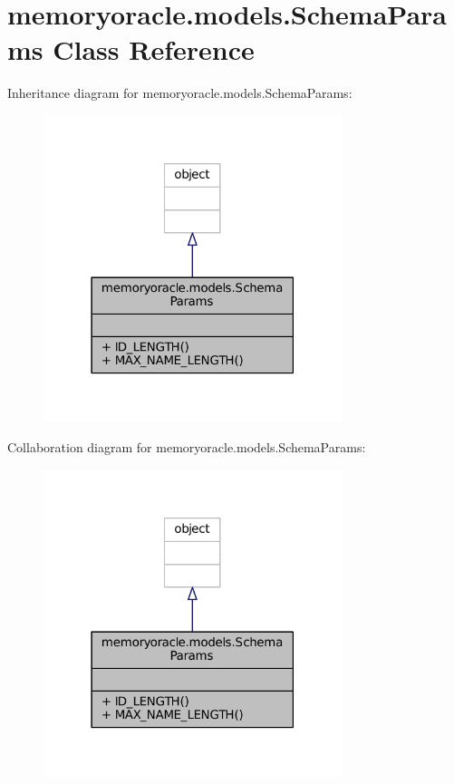 \hypertarget{classmemoryoracle_1_1models_1_1SchemaParams}{}\section{memoryoracle.\+models.\+Schema\+Params Class Reference}
\label{classmemoryoracle_1_1models_1_1SchemaParams}


Inheritance diagram for memoryoracle.\+models.\+Schema\+Params\+:
\nopagebreak
\begin{figure}[H]
\begin{center}
\leavevmode
\includegraphics[width=247pt]{classmemoryoracle_1_1models_1_1SchemaParams__inherit__graph}
\end{center}
\end{figure}


Collaboration diagram for memoryoracle.\+models.\+Schema\+Params\+:
\nopagebreak
\begin{figure}[H]
\begin{center}
\leavevmode
\includegraphics[width=247pt]{classmemoryoracle_1_1models_1_1SchemaParams__coll__graph}
\end{center}
\end{figure}
